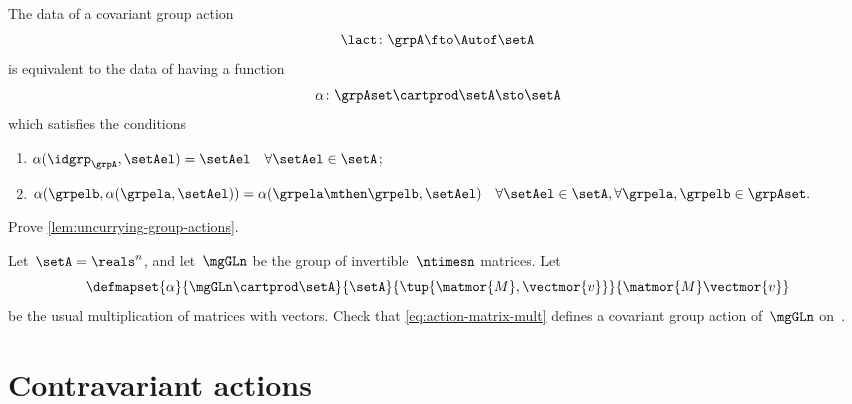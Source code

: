 \begin{lemma}
    \label{lem:uncurrying-group-actions}
    The data of a covariant group action
    \begin{equation}
        \lact \colon \grpA \fto \Autof\setA
    \end{equation}
    is equivalent to the data of having a function
    \begin{equation}
        \alpha \colon \grpAset \cartprod \setA \sto \setA
    \end{equation}
    which satisfies the conditions
    \begin{enumerate}
        \item $ \alpha (\idgrp_\grpA, \setAel) = \setAel \quad \forall \setAel \in \setA$;
        \item $ \alpha (\grpelb, \alpha(\grpela, \setAel)) = \alpha (\grpela \mthen \grpelb, \setAel) \quad \forall \setAel \in \setA, \forall \grpela, \grpelb \in \grpAset.
              $
    \end{enumerate}
\end{lemma}

\vfill%


\begin{gradedexercise}
    \label{ex:UncurryingGroupActions}
    Prove \cref{lem:uncurrying-group-actions}.
\end{gradedexercise}

\begin{gradedexercise}
    \label{ex:MatrixMultAction}
    Let~$\setA = \reals^n$, and let~$\mgGLn$ be the group of invertible~$\ntimesn$ matrices.
    Let
    \begin{equation}
        \label{eq:action-matrix-mult}
        \defmapset{
            \alpha
        }{
            \mgGLn \cartprod \setA
        }{
            \setA
        }{
            \tup{\matmor{M}, \vectmor{v}}
        }{
            \matmor{M}\vectmor{v}
        }
    \end{equation}
    be the usual multiplication of matrices with vectors.
    Check that \cref{eq:action-matrix-mult} defines a covariant group action of~$\mgGLn$ on~\setA.
\end{gradedexercise}


\section{Contravariant actions}

